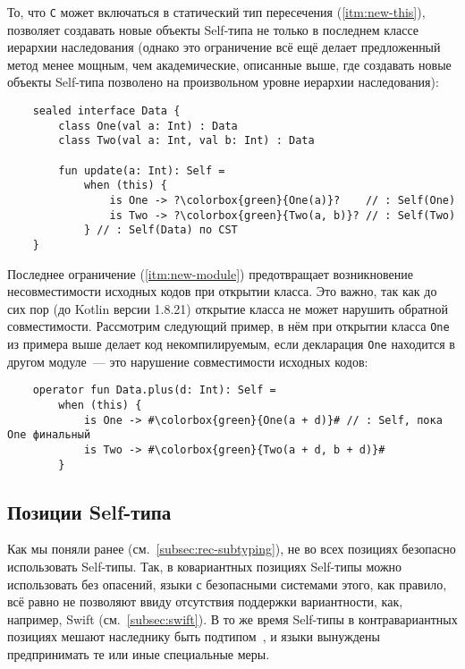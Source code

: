 То, что \texttt{C} может включаться в статический тип пересечения (\ref{itm:new-this}), позволяет создавать новые объекты Self-типа не только в последнем классе иерархии наследования (однако это ограничение всё ещё делает предложенный метод менее мощным, чем академические, описанные выше, где создавать новые объекты Self-типа позволено на произвольном уровне иерархии наследования):

\begin{verbatim}
    sealed interface Data {
        class One(val a: Int) : Data
        class Two(val a: Int, val b: Int) : Data

        fun update(a: Int): Self =
            when (this) {
                is One -> ?\colorbox{green}{One(a)}?    // : Self(One)
                is Two -> ?\colorbox{green}{Two(a, b)}? // : Self(Two)
            } // : Self(Data) по CST
    }
\end{verbatim}

Последнее ограничение (\ref{itm:new-module}) предотвращает возникновение несовместимости исходных кодов при открытии класса.
Это важно, так как до сих пор (до Kotlin версии 1.8.21) открытие класса не может нарушить обратной совместимости.
Рассмотрим следующий пример, в нём при открытии класса \texttt{One} из примера выше делает код некомпилируемым, если декларация \texttt{One} находится в другом модуле~--- это нарушение совместимости исходных кодов:

\begin{verbatim}
    operator fun Data.plus(d: Int): Self =
        when (this) {
            is One -> #\colorbox{green}{One(a + d)}# // : Self, пока One финальный
            is Two -> #\colorbox{green}{Two(a + d, b + d)}#
        }
\end{verbatim}


\subsection{Позиции Self-типа} \label{subsec:self-positions}

Как мы поняли ранее (см.~\ref{subsec:rec-subtyping}), не во всех позициях безопасно использовать Self-типы.
Так, в ковариантных позициях Self-типы можно использовать без опасений, языки с безопасными системами этого, как правило, всё равно не позволяют ввиду отсутствия поддержки вариантности, как, например, Swift (см.~\ref{subsec:swift}).
В то же время Self-типы в контравариантных позициях мешают наследнику быть подтипом~\cite{cook1989inheritance}, и языки вынуждены предпринимать те или иные специальные меры.

